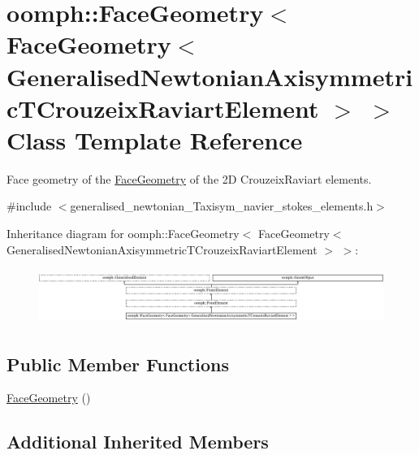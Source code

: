 \hypertarget{classoomph_1_1FaceGeometry_3_01FaceGeometry_3_01GeneralisedNewtonianAxisymmetricTCrouzeixRaviartElement_01_4_01_4}{}\section{oomph\+:\+:Face\+Geometry$<$ Face\+Geometry$<$ Generalised\+Newtonian\+Axisymmetric\+T\+Crouzeix\+Raviart\+Element $>$ $>$ Class Template Reference}
\label{classoomph_1_1FaceGeometry_3_01FaceGeometry_3_01GeneralisedNewtonianAxisymmetricTCrouzeixRaviartElement_01_4_01_4}


Face geometry of the \hyperlink{classoomph_1_1FaceGeometry}{Face\+Geometry} of the 2D Crouzeix\+Raviart elements.  




{\ttfamily \#include $<$generalised\+\_\+newtonian\+\_\+\+Taxisym\+\_\+navier\+\_\+stokes\+\_\+elements.\+h$>$}

Inheritance diagram for oomph\+:\+:Face\+Geometry$<$ Face\+Geometry$<$ Generalised\+Newtonian\+Axisymmetric\+T\+Crouzeix\+Raviart\+Element $>$ $>$\+:\begin{figure}[H]
\begin{center}
\leavevmode
\includegraphics[height=1.809370cm]{classoomph_1_1FaceGeometry_3_01FaceGeometry_3_01GeneralisedNewtonianAxisymmetricTCrouzeixRaviartElement_01_4_01_4}
\end{center}
\end{figure}
\subsection*{Public Member Functions}
\begin{DoxyCompactItemize}
\item 
\hyperlink{classoomph_1_1FaceGeometry_3_01FaceGeometry_3_01GeneralisedNewtonianAxisymmetricTCrouzeixRaviartElement_01_4_01_4_a65d8cb21f52472d6dfe23073bfc88843}{Face\+Geometry} ()
\end{DoxyCompactItemize}
\subsection*{Additional Inherited Members}


